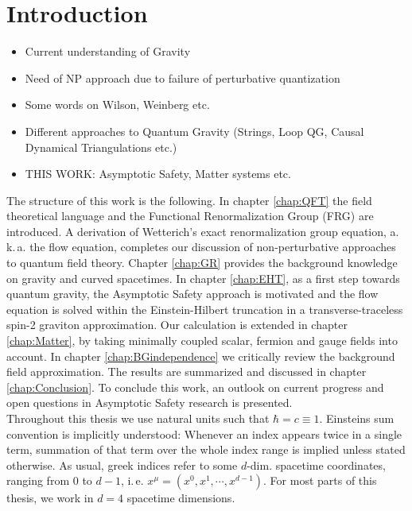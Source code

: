 \chapter{Introduction}



\begin{itemize}
	\item Current understanding of Gravity
	\item Need of NP approach due to failure of perturbative quantization
	\item Some words on Wilson, Weinberg etc.
	\item Different approaches to Quantum Gravity (Strings, Loop QG, Causal Dynamical Triangulations etc.)
	\item THIS WORK: Asymptotic Safety, Matter systems etc.
\end{itemize}

The structure of this work is the following. In chapter \ref{chap:QFT} the field theoretical language and the Functional Renormalization Group (FRG) are introduced. A derivation of Wetterich's exact renormalization group equation, a.\,k.\,a. the flow equation,  completes our discussion of non-perturbative approaches to quantum field theory. Chapter \ref{chap:GR} provides the background knowledge on gravity and curved spacetimes. In chapter \ref{chap:EHT}, as a first step towards quantum gravity, the Asymptotic Safety approach is motivated and the flow equation is solved within the Einstein-Hilbert truncation in a transverse-traceless spin-2 graviton approximation. Our calculation is extended in chapter \ref{chap:Matter}, by taking minimally coupled scalar, fermion and gauge fields into account. In chapter \ref{chap:BGindependence} we critically review the background field approximation.
The results are summarized and discussed in chapter \ref{chap:Conclusion}. To conclude this work, an outlook on current progress and open questions in Asymptotic Safety research is presented.\\
 Throughout this thesis we use natural units such that $\hbar = c  \equiv 1$. Einsteins sum convention is implicitly understood: Whenever an index appears twice in a single term, summation of that term over the whole index range is implied unless stated otherwise. As usual, greek indices refer to some $d$-dim. spacetime coordinates, ranging from $0$ to $d-1$, i.\,e. $x^{\mu} = (x^0, x^1, \cdots, x^{d-1})$. For most parts of this thesis, we work in $d=4$ spacetime dimensions.

